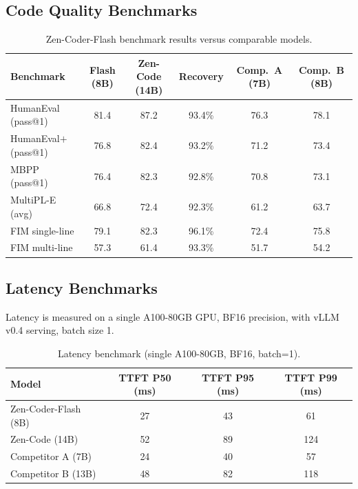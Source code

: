 \documentclass[11pt,a4paper]{article}
\begin{document}
\subsection{Code Quality Benchmarks}

\begin{table}[H]
\centering
\caption{Zen-Coder-Flash benchmark results versus comparable models.}
\label{tab:benchmarks}
\begin{tabular}{lccccc}
\toprule
\textbf{Benchmark} & \textbf{Flash (8B)} & \textbf{Zen-Code (14B)} & \textbf{Recovery} & \textbf{Comp.\ A (7B)} & \textbf{Comp.\ B (8B)} \\
\midrule
HumanEval (pass@1)     & 81.4 & 87.2 & 93.4\% & 76.3 & 78.1 \\
HumanEval$+$ (pass@1)  & 76.8 & 82.4 & 93.2\% & 71.2 & 73.4 \\
MBPP (pass@1)          & 76.4 & 82.3 & 92.8\% & 70.8 & 73.1 \\
MultiPL-E (avg)        & 66.8 & 72.4 & 92.3\% & 61.2 & 63.7 \\
\midrule
FIM single-line        & 79.1 & 82.3 & 96.1\% & 72.4 & 75.8 \\
FIM multi-line         & 57.3 & 61.4 & 93.3\% & 51.7 & 54.2 \\
\bottomrule
\end{tabular}
\end{table}

\subsection{Latency Benchmarks}

Latency is measured on a single A100-80GB GPU, BF16 precision, with vLLM v0.4
\cite{kwon2023efficient} serving, batch size 1.

\begin{table}[H]
\centering
\caption{Latency benchmark (single A100-80GB, BF16, batch=1).}
\label{tab:latency}
\begin{tabular}{lccc}
\toprule
\textbf{Model} & \textbf{TTFT P50 (ms)} & \textbf{TTFT P95 (ms)} & \textbf{TTFT P99 (ms)} \\
\midrule
Zen-Coder-Flash (8B) & 27 & 43  & 61  \\
Zen-Code (14B)       & 52 & 89  & 124 \\
Competitor A (7B)    & 24 & 40  & 57  \\
Competitor B (13B)   & 48 & 82  & 118 \\
\bottomrule
\end{tabular}
\end{table}
\end{document}
